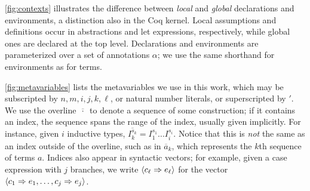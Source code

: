 \iffalse


\autoref{fig:terms-specific} lists shorthand for the kinds of annotated terms that we use, with $\epsilon$ indicating a lack of annotations.
From \CIChatminus and \CIChat, we have bare terms, which are necessary for subject reduction~\cite{cic-hat-minus}; position terms, which have asterisks to mark the types in \cofixpoint types with at most (for fixpoints) or at least (for cofixpoints) the same size as that of the \corecursive argument; and sized terms, used for termination and productivity checking.
We also have limit terms, which occur after erasure, and global terms, which occur in the types of global declarations similarly to how position terms occur in \cofixpoint types.
These terms correspond to bare, sized, and limit \lang: we begin with user-provided declarations as bare terms, produce size and position annotations during size inference while verifying termination and productivity, and finish by erasing sized terms to limit and global terms.
\begin{equation*}
    T^\circ \xrightarrow{\text{inference}} T, T^* \xrightarrow{\text{erasure}} T^\infty, T^\iota
\end{equation*}
\fi



\autoref{fig:contexts} illustrates the difference between \textit{local} and \textit{global} declarations and environments, a distinction also in the Coq kernel.
Local assumptions and definitions occur in abstractions and let expressions, respectively, while global ones are declared at the top level.
Declarations and environments are parameterized over a set of annotations $\alpha$; we use the same shorthand for environments as for terms.





\autoref{fig:metavariables} lists the metavariables we use in this work, which may be subscripted by $n, m, i, j, k, \ell$, or natural number literals, or superscripted by $'$.
We use the overline $\overline{\,\cdot\,}$ to denote a sequence of some construction; if it contains an index, the sequence spans the range of the index, usually given implicitly.
For instance, given $i$ inductive types, $\overline{I_k^{s_k}} = I_1^{s_1} \dots I_i^{s_i}$.
Notice that this is \textit{not} the same as an index outside of the overline, such as in $\overline{a}_k$, which represents the $k$th sequence of terms $a$.
Indices also appear in syntactic vectors; for example, given a case expression with $j$ branches, we write $\langle c_\ell \Rightarrow e_\ell\rangle$ for the vector $\langle c_1 \Rightarrow e_1, \dots, c_j \Rightarrow e_j\rangle$.

